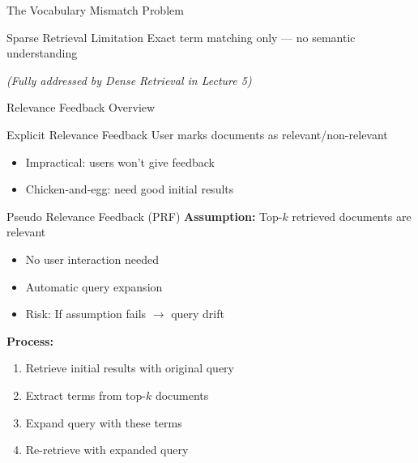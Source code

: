 \documentclass[aspectratio=169]{beamer}
\newif\ifanimated
\newcommand{\cpause}{\ifanimated\pause\fi}
\begin{document}
\begin{frame}[shrink=5]{The Vocabulary Mismatch Problem}
\vspace{1em}

\begin{alertblock}{Sparse Retrieval Limitation}
Exact term matching only --- no semantic understanding
\end{alertblock}

\vspace{0.5em}

\textit{(Fully addressed by Dense Retrieval in Lecture 5)}
\end{frame}

\begin{frame}[shrink=25]{Relevance Feedback Overview}
\begin{block}{Explicit Relevance Feedback}
User marks documents as relevant/non-relevant
\cpause
\begin{itemize}
    \item \textcolor{red}{} Impractical: users won't give feedback
    \item \textcolor{red}{} Chicken-and-egg: need good initial results
\end{itemize}\cpause
\end{block}

\vspace{1em}

\begin{block}{Pseudo Relevance Feedback (PRF)}
\textbf{Assumption:} Top-$k$ retrieved documents are relevant
\begin{itemize}
    \item \textcolor{green}{\checkmark} No user interaction needed
    \item \textcolor{green}{\checkmark} Automatic query expansion
    \item \textcolor{red}{} Risk: If assumption fails $\rightarrow$ query drift
\end{itemize}\cpause
\end{block}

\vspace{1em}

\textbf{Process:}
\begin{enumerate}
    \item Retrieve initial results with original query
    \item Extract terms from top-$k$ documents
    \item Expand query with these terms
    \item Re-retrieve with expanded query
\end{enumerate}
\end{frame}
\end{document}
